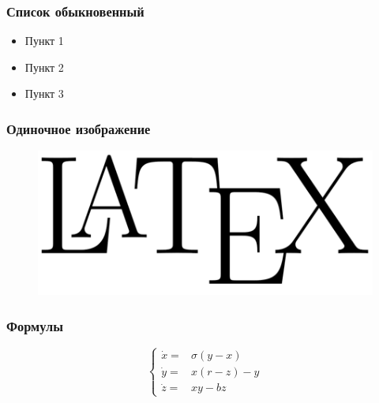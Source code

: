 \documentclass[14pt]{beamer}
\begin{document}
\begin{frame}
\frametitle{Список обыкновенный}
\begin{itemize}
  \item Пункт 1
  \item Пункт 2
  \item Пункт 3
\end{itemize}
\end{frame}

\begin{frame}
\frametitle{Одиночное изображение}
\begin{figure}[H]
  \center
  \includegraphics[width=0.8\linewidth]{latex}
\end{figure}
\end{frame}

\begin{frame}
\frametitle{Формулы}
$$
\left\{
  \begin{array}{rl}
    \dot x = & \sigma (y-x) \\
    \dot y = & x (r - z) - y \\
    \dot z = & xy - bz
  \end{array}
\right.
$$
\end{frame}
\end{document}
